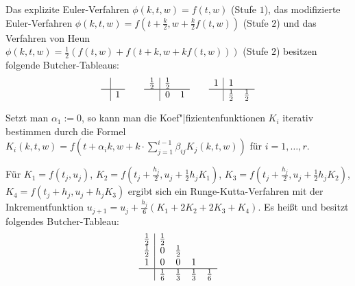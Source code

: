 \begin{Bsp}
    Das explizite Euler-Verfahren $\phi(k, t, w) = f(t, w)$ (Stufe $1$),
    das modifizierte Euler-Verfahren
    $\phi(k, t, w) = f(t + \frac{k}{2}, w + \frac{k}{2} f(t, w))$
    (Stufe $2$) und das Verfahren von Heun\\
    $\phi(k, t, w) = \frac{1}{2} (f(t, w) + f(t + k, w + k f(t, w)))$
    (Stufe $2$)
    besitzen folgende Butcher-Tableaus:
    \begin{align*}
        \begin{array}{c|c}
            \\\hline
            & 1
        \end{array}
        \qquad
        \begin{array}{c|ccc}
            \frac{1}{2} & \frac{1}{2}\\\hline
            & 0 & 1
        \end{array}
        \qquad
        \begin{array}{c|ccc}
            1 & 1\\\hline
            & \frac{1}{2} & \frac{1}{2}
        \end{array}
    \end{align*}
\end{Bsp}

\begin{Bem}
    Setzt man $\alpha_1 := 0$, so kann man die Koef"|fizientenfunktionen
    $K_i$ iterativ bestimmen durch die Formel
    $K_i(k, t, w) = f(t + \alpha_i k,
    w + k \cdot \sum_{j=1}^{i-1} \beta_{ij} K_j(k, t, w))$ für
    $i = 1, \dotsc, r$.
\end{Bem}

\begin{Bsp}
    Für $K_1 = f(t_j, u_j)$,
    $K_2 = f(t_j + \frac{h_j}{2}, u_j + \frac{1}{2} h_j K_1)$,
    $K_3 = f(t_j + \frac{h_j}{2}, u_j + \frac{1}{2} h_j K_2)$,
    $K_4 = f(t_j + h_j, u_j + h_j K_3)$ ergibt sich ein
    Runge-Kutta-Verfahren mit der Inkrementfunktion
    $u_{j+1} = u_j + \frac{h_j}{6} (K_1 + 2K_2 + 2K_3 + K_4)$.
    Es heißt  und
    besitzt folgendes Butcher-Tableau:
    \begin{align*}
        \begin{array}{c|cccc}
            \frac{1}{2} & \frac{1}{2} \\
            \frac{1}{2} & 0 & \frac{1}{2}\\
            1 & 0 & 0 & 1\\\hline
            & \frac{1}{6} & \frac{1}{3} & \frac{1}{3} & \frac{1}{6}
        \end{array}
    \end{align*}
\end{Bsp}

